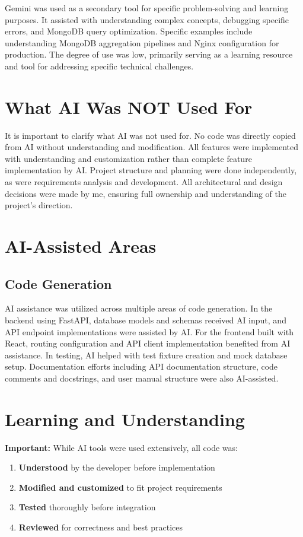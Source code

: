 \documentclass[12pt,a4paper]{report}
\begin{document}
Gemini was used as a secondary tool for specific problem-solving and learning purposes. It assisted with understanding complex concepts, debugging specific errors, and MongoDB query optimization. Specific examples include understanding MongoDB aggregation pipelines and Nginx configuration for production. The degree of use was low, primarily serving as a learning resource and tool for addressing specific technical challenges.

\section{What AI Was NOT Used For}

It is important to clarify what AI was not used for. No code was directly copied from AI without understanding and modification. All features were implemented with understanding and customization rather than complete feature implementation by AI. Project structure and planning were done independently, as were requirements analysis and development. All architectural and design decisions were made by me, ensuring full ownership and understanding of the project's direction.

\section{AI-Assisted Areas}

\subsection{Code Generation}

AI assistance was utilized across multiple areas of code generation. In the backend using FastAPI, database models and schemas received AI input, and API endpoint implementations were assisted by AI. For the frontend built with React, routing configuration and API client implementation benefited from AI assistance. In testing, AI helped with test fixture creation and mock database setup. Documentation efforts including API documentation structure, code comments and docstrings, and user manual structure were also AI-assisted.

\section{Learning and Understanding}

\textbf{Important:} While AI tools were used extensively, all code was:
\begin{enumerate}
    \item \textbf{Understood} by the developer before implementation
    \item \textbf{Modified and customized} to fit project requirements
    \item \textbf{Tested} thoroughly before integration
    \item \textbf{Reviewed} for correctness and best practices
\end{enumerate}
\end{document}
